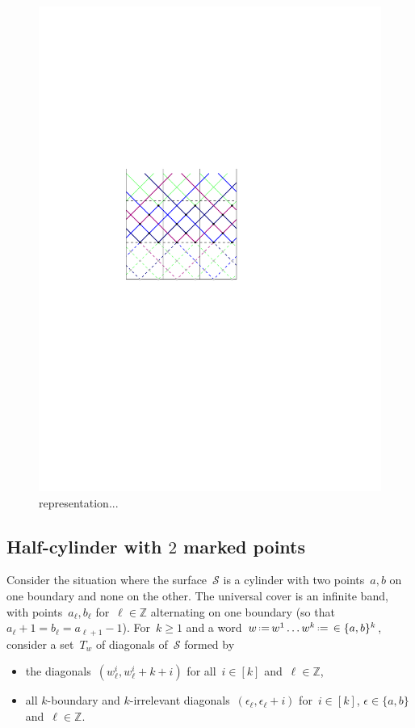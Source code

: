 \documentclass{amsart}
\theoremstyle{remark}
\newcommand{\Z}{\mathbb{Z}} %
\newcommand{\eqdef}{\mbox{\,\raisebox{0.2ex}{\scriptsize\ensuremath{\mathrm:}}\ensuremath{=}\,}} %
\newcommand{\surface}{\mathcal{S}}
\begin{document}
\begin{figure}
\label{fig:saturatedHC2}
\includegraphics[scale=1]{saturatedHC}
\caption{representation...}
\end{figure}


\subsection{Half-cylinder with $2$ marked points}

Consider the situation where the surface~$\surface$ is a cylinder with two points~$a,b$ on one boundary and none on the other.
The universal cover is an infinite band, with points~$a_{\ell}, b_{\ell}$ for~$\ell \in \Z$ alternating on one boundary (so that~$a_\ell+1 = b_\ell = a_{\ell+1}-1$).
For~$k \ge 1$ and a word~$w \eqdef w^1 \dots w^k \eqdef  \in \{a,b\}^k$, consider a set~$T_w$ of diagonals of~$\surface$ formed by
\begin{itemize}
\item the diagonals~$(w^i_\ell, w^i_{\ell}+k+i)$ for all~$i \in [k]$ and~$\ell \in \Z$,
\item all $k$-boundary and $k$-irrelevant diagonals~$(\epsilon_{\ell}, \epsilon_{\ell}+i)$ for~$i \in [k]$, $\epsilon \in \{a,b\}$ and~$\ell \in \Z$.
\end{itemize}
\end{document}
